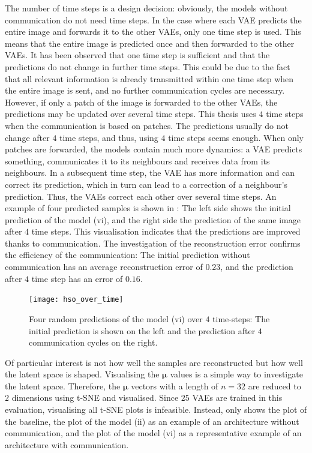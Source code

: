 The number of time steps is a design decision: obviously, the models without communication do not need time steps. In the case where each VAE predicts the entire image and forwards it to the other VAEs, only one time step is used. This means that the entire image is predicted once and then forwarded to the other VAEs. It has been observed that one time step is sufficient and that the predictions do not change in further time steps. This could be due to the fact that all relevant information is already transmitted within one time step when the entire image is sent, and no further communication cycles are necessary. However, if only a patch of the image is forwarded to the other VAEs, the predictions may be updated over several time steps. This thesis uses $4$ time steps when the communication is based on patches. The predictions usually do not change after $4$ time steps, and thus, using $4$ time steps seems enough. When only patches are forwarded, the models contain much more dynamics: a VAE predicts something, communicates it to its neighbours and receives data from its neighbours. In a subsequent time step, the VAE has more information and can correct its prediction, which in turn can lead to a correction of a neighbour's prediction. Thus, the VAEs correct each other over several time steps. An example of four predicted samples is shown in : The left side shows the initial prediction of the model (vi), and the right side the prediction of the same image after $4$ time steps. This visualisation indicates that the predictions are improved thanks to communication. The investigation of the reconstruction error confirms the efficiency of the communication: The initial prediction without communication has an average reconstruction error of $0.23$, and the prediction after $4$ time step has an error of $0.16$.

\begin{figure}[h]
    \centering
    \texttt{[image: hso\_over\_time]}
    \caption[Change of the model's prediction over time]{Four random predictions of the model (vi) over $4$ time-steps: The initial prediction is shown on the left and the prediction after $4$ communication cycles on the right.}
\end{figure}

Of particular interest is not how well the samples are reconstructed but how well the latent space is shaped. Visualising the $\boldsymbol{\mu}$ values is a simple way to investigate the latent space. Therefore, the $\boldsymbol{\mu}$ vectors with a length of $n=32$ are reduced to $2$ dimensions using t-SNE  and visualised. Since $25$ VAEs are trained in this evaluation, visualising all t-SNE plots is infeasible. Instead,  only shows the plot of the baseline, the plot of the model (ii) as an example of an architecture without communication, and the plot of the model (vi) as a representative example of an architecture with communication. 


